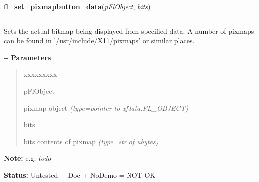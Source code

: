     \label{xformslib:flbitmap:fl_set_pixmap_data}

    \vspace{0.5ex}

\hspace{.8\funcindent}\begin{boxedminipage}{\funcwidth}

    \raggedright \textbf{fl\_set\_pixmapbutton\_data}(\textit{pFlObject}, \textit{bits})

    \vspace{-1.5ex}

    \rule{\textwidth}{0.5\fboxrule}
\setlength{\parskip}{2ex}

Sets the actual bitmap being displayed from specified data. A
number of pixmaps can be found in '/usr/include/X11/pixmaps' or similar
places.

-{}-
\setlength{\parskip}{1ex}
      \textbf{Parameters}
      \vspace{-1ex}

      \begin{quote}
        \begin{Ventry}{xxxxxxxxx}

          \item[pFlObject]


pixmap object
            {\it (type=pointer to xfdata.FL\_OBJECT)}

          \item[bits]


bits contents of pixmap
            {\it (type=str of ubytes)}

        \end{Ventry}

      \end{quote}

\textbf{Note:} 
e.g. \emph{todo}


\textbf{Status:} 
Untested + Doc + NoDemo = NOT OK


    \end{boxedminipage}

    \label{xformslib:flbutton:fl_set_pixmapbutton_focus_outline}

    \vspace{0.5ex}

